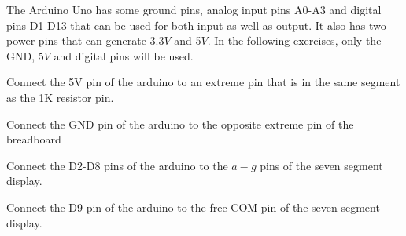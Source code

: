 
The Arduino Uno has some ground pins, analog input pins A0-A3 and digital pins D1-D13 that can be used for both input as well as output. It also has two power pins that can generate 3.3$V$ and 5$V$.  In the following exercises, only the GND, 5$V$ and digital pins will be used.
%
%
\begin{problem}
	Connect the 5V pin of the arduino to an  extreme pin that is in the same segment as the 1K resistor pin. 
	\end{problem}	
\begin{problem}
	Connect the GND pin of the arduino to the opposite extreme pin of the breadboard
\end{problem}
\begin{problem}
	Connect the D2-D8 pins of the arduino to the $a-g$ pins of the seven segment display. 
\end{problem}
%
\begin{problem}
	Connect the D9 pin of the arduino to the free COM pin of the seven segment display. 
\end{problem}

